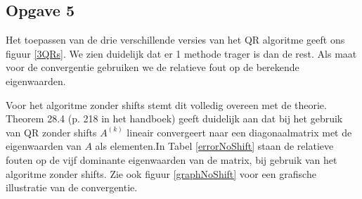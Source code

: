 \documentclass[a4paper, 12pt, titlepage]{report}
\begin{document}
\subsection{Opgave 5}
Het toepassen van de drie verschillende versies van het QR algoritme geeft ons figuur \ref{3QRs}. We zien duidelijk dat er 1 methode trager is dan de rest. Als maat voor de convergentie gebruiken we de relatieve fout op de berekende eigenwaarden. 

Voor het algoritme zonder shifts stemt dit volledig overeen met de theorie. Theorem 28.4 (p. 218 in het handboek) geeft duidelijk aan dat bij het gebruik van QR zonder shifts $A^{(k)}$ lineair convergeert naar een diagonaalmatrix met de eigenwaarden van $A$ als elementen.In Tabel \ref{errorNoShift} staan de relatieve fouten op de vijf dominante eigenwaarden van de matrix, bij gebruik van het algoritme zonder shifts. Zie ook figuur \ref{graphNoShift} voor een grafische illustratie van de convergentie.\\
\end{document}
